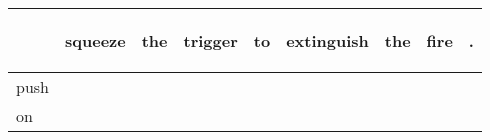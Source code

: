 \documentclass[landscape]{article}
\newcommand{\ssp}{\hspace{2pt}}
\begin{document}
\noindent\begin{tabular}{|l|p{10pt}|p{10pt}|p{10pt}|p{10pt}|p{10pt}|p{10pt}|p{10pt}|p{10pt}|}
\hline
&\begin{sideways}\cellcolor{ref0}squeeze\hspace{12pt}\end{sideways}&\begin{sideways}\cellcolor{ref1}the\hspace{12pt}\end{sideways}&\begin{sideways}\cellcolor{ref2}trigger\hspace{12pt}\end{sideways}&\begin{sideways}\cellcolor{ref3}to\hspace{12pt}\end{sideways}&\begin{sideways}\cellcolor{ref4}extinguish\hspace{12pt}\end{sideways}&\begin{sideways}\cellcolor{ref5}the\hspace{12pt}\end{sideways}&\begin{sideways}\cellcolor{ref6}fire\hspace{12pt}\end{sideways}&\begin{sideways}\cellcolor{ref7}.\hspace{12pt}\end{sideways}\\
\hline
\ssp push \ssp&\hspace{2pt}&\hspace{2pt}&\hspace{2pt}&\hspace{2pt}&\hspace{2pt}&\hspace{2pt}&\hspace{2pt}&\hspace{2pt}\\
\hline
\ssp on \ssp&\hspace{2pt}&\hspace{2pt}&\hspace{2pt}&\hspace{2pt}&\hspace{2pt}&\hspace{2pt}&\hspace{2pt}&\hspace{2pt}\\

\end{tabular}
\end{document}
